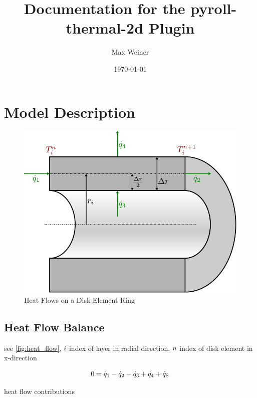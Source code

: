\documentclass{scrartcl}
\begin{document}
    \title{Documentation for the pyroll-thermal-2d Plugin}
    \author{Max Weiner}
    \date{\today}

    \maketitle


    \section{Model Description}\label{sec:model-description}

    \begin{figure}
        \centering
        \includegraphics[scale=0.8]{img/heat_flow}
        \caption{Heat Flows on a Disk Element Ring}
        \label{fig:heat_flow}
    \end{figure}

    \subsection{Heat Flow Balance}

    see \autoref{fig:heat_flow}, ${i}$ index of layer in radial direction, ${n}$ index of disk element in x-direction

    \begin{equation}
        0 = {\dot{q}}_1 - {\dot{q}}_2 - {\dot{q}}_3 + {\dot{q}}_4 + {\dot{q}_\mathrm{S}}
        \label{eq:heat_flow_balance}
    \end{equation}

    heat flow contributions
\end{document}
